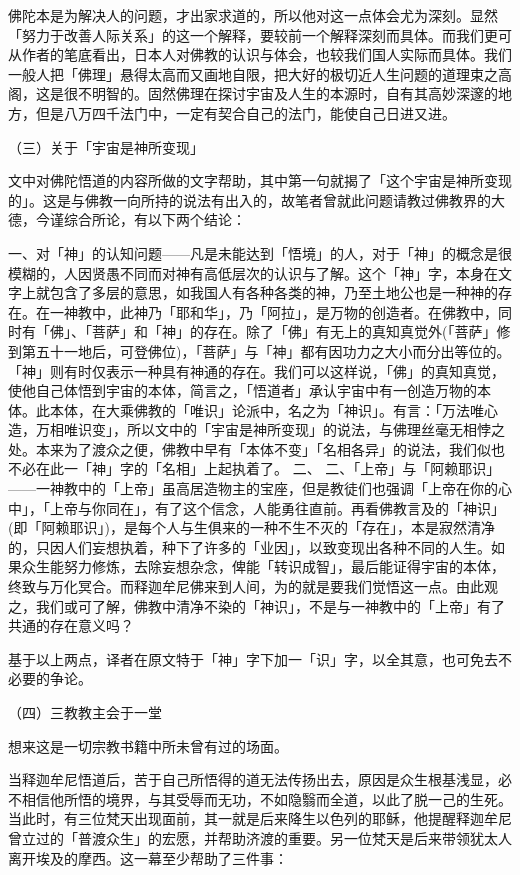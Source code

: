 \documentclass[twoside,openany]{book}
\begin{document}
佛陀本是为解决人的问题，才出家求道的，所以他对这一点体会尤为深刻。显然「努力于改善人际关系」的这一个解释，要较前一个解释深刻而具体。而我们更可从作者的笔底看出，日本人对佛教的认识与体会，也较我们国人实际而具体。我们一般人把「佛理」悬得太高而又画地自限，把大好的极切近人生问题的道理束之高阁，这是很不明智的。固然佛理在探讨宇宙及人生的本源时，自有其高妙深邃的地方，但是八万四千法门中，一定有契合自己的法门，能使自己日进又进。

（三）关于「宇宙是神所变现」

文中对佛陀悟道的内容所做的文字帮助，其中第一句就揭了「这个宇宙是神所变现的」。这是与佛教一向所持的说法有出入的，故笔者曾就此问题请教过佛教界的大德，今谨综合所论，有以下两个结论：

一、对「神」的认知问题——凡是未能达到「悟境」的人，对于「神」的概念是很模糊的，人因贤愚不同而对神有高低层次的认识与了解。这个「神」字，本身在文字上就包含了多层的意思，如我国人有各种各类的神，乃至土地公也是一种神的存在。在一神教中，此神乃「耶和华」，乃「阿拉」，是万物的创造者。在佛教中，同时有「佛」、「菩萨」和「神」的存在。除了「佛」有无上的真知真觉外(「菩萨」修到第五十一地后，可登佛位)，「菩萨」与「神」都有因功力之大小而分出等位的。「神」则有时仅表示一种具有神通的存在。我们可以这样说，「佛」的真知真觉，使他自己体悟到宇宙的本体，简言之，「悟道者」承认宇宙中有一创造万物的本体。此本体，在大乘佛教的「唯识」论派中，名之为「神识」。有言：「万法唯心造，万相唯识变」，所以文中的「宇宙是神所变现」的说法，与佛理丝毫无相悖之处。本来为了渡众之便，佛教中早有「本体不变」「名相各异」的说法，我们似也不必在此一「神」字的「名相」上起执着了。
二、
二、「上帝」与「阿赖耶识」——一神教中的「上帝」虽高居造物主的宝座，但是教徒们也强调「上帝在你的心中」，「上帝与你同在」，有了这个信念，人能勇往直前。再看佛教言及的「神识」(即「阿赖耶识」)，是每个人与生俱来的一种不生不灭的「存在」，本是寂然清净的，只因人们妄想执着，种下了许多的「业因」，以致变现出各种不同的人生。如果众生能努力修炼，去除妄想杂念，俾能「转识成智」，最后能证得宇宙的本体，终致与万化冥合。而释迦牟尼佛来到人间，为的就是要我们觉悟这一点。由此观之，我们或可了解，佛教中清净不染的「神识」，不是与一神教中的「上帝」有了共通的存在意义吗？

基于以上两点，译者在原文特于「神」字下加一「识」字，以全其意，也可免去不必要的争论。

（四）三教教主会于一堂

想来这是一切宗教书籍中所未曾有过的场面。

当释迦牟尼悟道后，苦于自己所悟得的道无法传扬出去，原因是众生根基浅显，必不相信他所悟的境界，与其受辱而无功，不如隐翳而全道，以此了脱一己的生死。当此时，有三位梵天出现面前，其一就是后来降生以色列的耶稣，他提醒释迦牟尼曾立过的「普渡众生」的宏愿，并帮助济渡的重要。另一位梵天是后来带领犹太人离开埃及的摩西。这一幕至少帮助了三件事：
\end{document}

